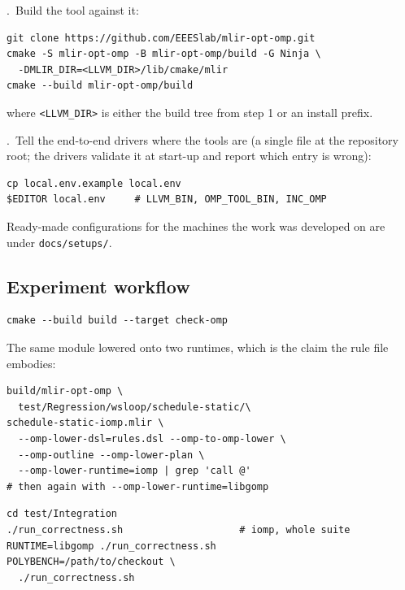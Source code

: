 .\ Build the tool against it:

{\small
\begin{verbatim}
git clone https://github.com/EEESlab/mlir-opt-omp.git
cmake -S mlir-opt-omp -B mlir-opt-omp/build -G Ninja \
  -DMLIR_DIR=<LLVM_DIR>/lib/cmake/mlir
cmake --build mlir-opt-omp/build
\end{verbatim}
}

\noindent where \texttt{<LLVM\_DIR>} is either the build tree from step 1 or an
install prefix.

.\ Tell the end-to-end drivers where the tools are (a single file at
the repository root; the drivers validate it at start-up and report which entry
is wrong):

{\small
\begin{verbatim}
cp local.env.example local.env
$EDITOR local.env     # LLVM_BIN, OMP_TOOL_BIN, INC_OMP
\end{verbatim}
}

\noindent Ready-made configurations for the machines the work was developed on
are under \texttt{docs/setups/}.

\subsection{Experiment workflow}


{\small
\begin{verbatim}
cmake --build build --target check-omp
\end{verbatim}
}

\noindent The same module lowered onto two runtimes, which is the claim the
rule file embodies:

{\small
\begin{verbatim}
build/mlir-opt-omp \
  test/Regression/wsloop/schedule-static/\
schedule-static-iomp.mlir \
  --omp-lower-dsl=rules.dsl --omp-to-omp-lower \
  --omp-outline --omp-lower-plan \
  --omp-lower-runtime=iomp | grep 'call @'
# then again with --omp-lower-runtime=libgomp
\end{verbatim}
}


{\small
\begin{verbatim}
cd test/Integration
./run_correctness.sh                    # iomp, whole suite
RUNTIME=libgomp ./run_correctness.sh
POLYBENCH=/path/to/checkout \
  ./run_correctness.sh
\end{verbatim}
}

